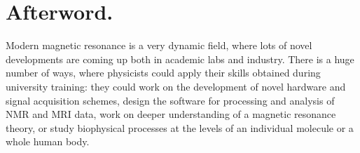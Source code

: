 \documentclass[a4paper, 12pt]{article}
\begin{document}
 

\section{Afterword.}
 Modern magnetic resonance is a very dynamic field, where lots of novel developments are coming up both in academic labs and industry. There is a huge number of ways, where physicists could apply their skills obtained during university training: they could work on the development of novel hardware and signal acquisition schemes, design the software for processing and analysis of NMR and MRI data, work on deeper understanding of a magnetic resonance theory, or study biophysical processes at the levels of an individual molecule or a whole human body.
\end{document}
